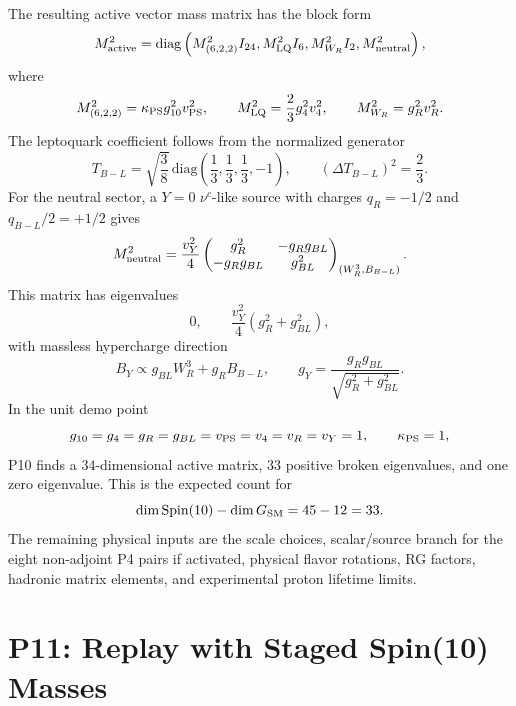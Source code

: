 \documentclass[11pt]{article}
\newcommand{\Spin}{\mathrm{Spin}}
\newcommand{\diag}{\mathrm{diag}}
\newcommand{\nuc}{\nu^c}
\begin{document}
The resulting active vector mass matrix has the block form
\begin{equation}
  M^2_{\rm active}
  =
  \diag\left(
    M_{(6,2,2)}^2 I_{24},
    M_{\rm LQ}^2 I_6,
    M_{W_R}^2 I_2,
    M_{\rm neutral}^2
  \right),
\end{equation}
where
\begin{equation}
  M_{(6,2,2)}^2=\kappa_{\rm PS}g_{10}^2v_{\rm PS}^2,
  \qquad
  M_{\rm LQ}^2=\frac23 g_4^2v_4^2,
  \qquad
  M_{W_R}^2=g_R^2v_R^2.
\end{equation}
The leptoquark coefficient follows from the normalized generator
\begin{equation}
  T_{B-L}
  =
  \sqrt{\frac38}\,
  \diag\left(\frac13,\frac13,\frac13,-1\right),
  \qquad
  (\Delta T_{B-L})^2=\frac23 .
\end{equation}
For the neutral sector, a $Y=0$ $\nuc$-like source with charges
$q_R=-1/2$ and $q_{B-L}/2=+1/2$ gives
\begin{equation}
  M_{\rm neutral}^2
  =
  \frac{v_Y^2}{4}
  \begin{pmatrix}
    g_R^2 & -g_Rg_{BL}\\
    -g_Rg_{BL} & g_{BL}^2
  \end{pmatrix}_{(W_R^3,B_{B-L})}.
\end{equation}
This matrix has eigenvalues
\begin{equation}
  0,\qquad
  \frac{v_Y^2}{4}(g_R^2+g_{BL}^2),
\end{equation}
with massless hypercharge direction
\begin{equation}
  B_Y\propto g_{BL}W_R^3+g_RB_{B-L},
  \qquad
  g_Y=\frac{g_Rg_{BL}}{\sqrt{g_R^2+g_{BL}^2}}.
\end{equation}
In the unit demo point
\begin{equation}
  g_{10}=g_4=g_R=g_{BL}=v_{\rm PS}=v_4=v_R=v_Y=1,
  \qquad
  \kappa_{\rm PS}=1,
\end{equation}
P10 finds a $34$-dimensional active matrix, $33$ positive broken eigenvalues,
and one zero eigenvalue.  This is the expected count for
\begin{equation}
  \dim\Spin(10)-\dim G_{\rm SM}=45-12=33.
\end{equation}
The remaining physical inputs are the scale choices, scalar/source branch for
the eight non-adjoint P4 pairs if activated, physical flavor rotations, RG
factors, hadronic matrix elements, and experimental proton lifetime limits.

\section{P11: Replay with Staged Spin(10) Masses}
\end{document}
